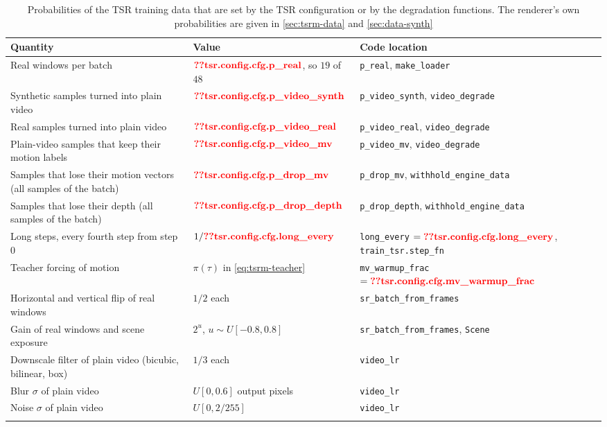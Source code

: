 \begin{table}[!htbp]
\caption{Probabilities of the TSR training data that are set by the TSR configuration or by the degradation functions. The renderer's own probabilities are given in \cref{sec:tsrm-data} and \cref{sec:data-synth}}\label{tab:tsrm-mix}
{\scriptsize\raggedright\setlength{\tabcolsep}{3pt}
\begin{tabular*}{\textwidth}{@{\extracolsep\fill}p{}p{}p{}}
\toprule
Quantity & Value & Code location \\
\midrule
Real windows per batch & $\Res{tsr.config.cfg.p_real}$, so $19$ of $48$ & \texttt{p\_real}, \texttt{make\_loader} \\
Synthetic samples turned into plain video & $\Res{tsr.config.cfg.p_video_synth}$ & \texttt{p\_video\_synth}, \texttt{video\_degrade} \\
Real samples turned into plain video & $\Res{tsr.config.cfg.p_video_real}$ & \texttt{p\_video\_real}, \texttt{video\_degrade} \\
Plain-video samples that keep their motion labels & $\Res{tsr.config.cfg.p_video_mv}$ & \texttt{p\_video\_mv}, \texttt{video\_degrade} \\
Samples that lose their motion vectors (all samples of the batch) & $\Res{tsr.config.cfg.p_drop_mv}$ & \texttt{p\_drop\_mv}, \texttt{withhold\_engine\_data} \\
Samples that lose their depth (all samples of the batch) & $\Res{tsr.config.cfg.p_drop_depth}$ & \texttt{p\_drop\_depth}, \texttt{withhold\_engine\_data} \\
Long steps, every fourth step from step $0$ & $1/\Res{tsr.config.cfg.long_every}$ & \texttt{long\_every} $=\Res{tsr.config.cfg.long_every}$, \texttt{train\_tsr.step\_fn} \\
Teacher forcing of motion & $\pi(\tau)$ in \cref{eq:tsrm-teacher} & \texttt{mv\_warmup\_frac} $=\Res{tsr.config.cfg.mv_warmup_frac}$ \\
Horizontal and vertical flip of real windows & $1/2$ each & \texttt{sr\_batch\_from\_frames} \\
Gain of real windows and scene exposure & $2^{u}$, $u\sim U[-0.8,0.8]$ & \texttt{sr\_batch\_from\_frames}, \texttt{Scene} \\
Downscale filter of plain video (bicubic, bilinear, box) & $1/3$ each & \texttt{video\_lr} \\
Blur $\sigma$ of plain video & $U[0,0.6]$ output pixels & \texttt{video\_lr} \\
Noise $\sigma$ of plain video & $U[0,2/255]$ & \texttt{video\_lr} \\
\botrule
\end{tabular*}}
\end{table}

